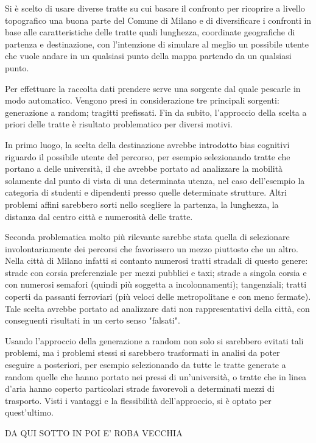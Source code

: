 Si è scelto di usare diverse tratte su cui basare il confronto per ricoprire a livello topografico una buona parte del Comune di Milano e di diversificare i confronti in base alle caratteristiche delle tratte quali lunghezza, coordinate geografiche di partenza e destinazione, con l'intenzione di simulare al meglio un possibile utente che vuole andare in un qualsiasi punto della mappa partendo da un qualsiasi punto.

Per effettuare la raccolta dati prendere serve una sorgente dal quale pescarle in modo automatico. Vengono presi in considerazione tre principali sorgenti: generazione a random; tragitti prefissati. Fin da subito, l'approccio della scelta a priori delle tratte è risultato problematico per diversi motivi.

In primo luogo, la scelta della destinazione avrebbe introdotto bias cognitivi riguardo il possibile utente del percorso, per esempio selezionando tratte che portano a delle università, il che avrebbe portato ad analizzare la mobilità solamente dal punto di vista di una determinata utenza, nel caso dell'esempio la categoria di studenti e dipendenti presso quelle determinate strutture. Altri problemi affini sarebbero sorti nello scegliere la partenza, la lunghezza, la distanza dal centro città e numerosità delle tratte.

Seconda problematica molto più rilevante sarebbe stata quella di selezionare involontariamente dei percorsi che favorissero un mezzo piuttosto che un altro. Nella città di Milano infatti si contanto numerosi tratti stradali di questo genere: strade con corsia preferenziale per mezzi pubblici e taxi; strade a singola corsia e con numerosi semafori (quindi più soggetta a incolonnamenti); tangenziali; tratti coperti da passanti ferroviari (più veloci delle metropolitane e con meno fermate). Tale scelta avrebbe portato ad analizzare dati non rappresentativi della città, con conseguenti risultati in un certo senso "falsati".

Usando l'approccio della generazione a random non solo si sarebbero evitati tali problemi, ma i problemi stessi si sarebbero trasformati in analisi da poter eseguire a posteriori, per esempio selezionando da tutte le tratte generate a random quelle che hanno portato nei pressi di un'università, o tratte che in linea d'aria hanno coperto particolari strade favorevoli a determinati mezzi di trasporto. Visti i vantaggi e la flessibilità dell'approccio, si è optato per quest'ultimo.

DA QUI SOTTO IN POI E' ROBA VECCHIA

